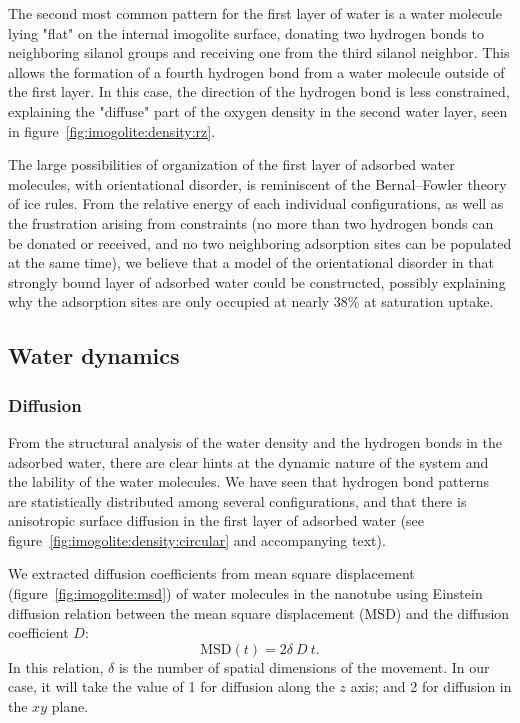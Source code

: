 \documentclass[thesis]{subfiles}
\begin{document}
The second most common pattern for the first layer of water is a water molecule
lying "flat" on the internal imogolite surface, donating two hydrogen bonds to
neighboring silanol groups and receiving one from the third silanol neighbor.
This allows the formation of a fourth hydrogen bond from a water molecule
outside of the first layer. In this case, the direction of the hydrogen bond is
less constrained, explaining the "diffuse" part of the oxygen density in the
second water layer, seen in figure~\ref{fig:imogolite:density:rz}.

The large possibilities of organization of the first layer of adsorbed water
molecules, with orientational disorder, is reminiscent of the Bernal--Fowler
theory of ice rules\cite{Bernal1933}. From the relative energy of each
individual configurations, as well as the frustration arising from constraints
(no more than two hydrogen bonds can be donated or received, and no two neighboring
adsorption sites can be populated at the same time), we believe that a model of
the orientational disorder in that strongly bound layer of adsorbed water could
be constructed, possibly explaining why the adsorption sites are only occupied
at nearly 38\% at saturation uptake.

\subsection{Water dynamics}

\subsubsection{Diffusion}

From the structural analysis of the water density and the hydrogen bonds in the
adsorbed water, there are clear hints at the dynamic nature of the system and
the lability of the water molecules. We have seen that hydrogen bond patterns
are statistically distributed among several configurations, and that there is
anisotropic surface diffusion in the first layer of adsorbed water (see
figure~\ref{fig:imogolite:density:circular} and accompanying text).

We extracted diffusion coefficients from mean square displacement
(figure~\ref{fig:imogolite:msd}) of water molecules in the nanotube using
Einstein diffusion relation between the mean square displacement (MSD) and the
diffusion coefficient $D$:
\[ \text{MSD}(t) = 2 \delta \ D \ t. \]
In this relation, $\delta$ is the number of spatial dimensions of the movement.
In our case, it will take the value of 1 for diffusion along the $z$ axis; and 2
for diffusion in the $xy$ plane.
\end{document}
